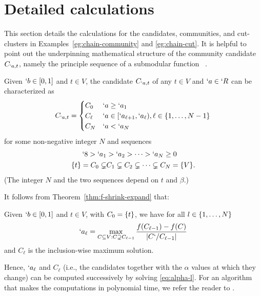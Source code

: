 \section{Detailed calculations}
\label{sec:calculations}
This section details the calculations for the candidates, communities, and cut-clusters
in Examples~\ref{eg:chain-community} and \ref{eg:chain-cut}.
It is helpful to point out the underpinning mathematical structure of
the community candidate $C_{`a,t}$, namely the principle sequence of a submodular function~\cite{fujishige80} \cite{fujishige-pp-revisited}.

\begin{proposition}
  \label{pro:ps}
  Given $`b\in [0,1]$ and $t\in V$, the candidate $C_{`a,t}$ of any $t\in V$ and $`a\in `R$ can be characterized as
  \begin{align}
    C_{`a,t}  = \begin{cases}
      C_0 & `a\geq `a_1\\
      C_{\ell} & `a\in [`a_{\ell+1},`a_{\ell}), \ell \in \{1,\dots,N-1\}\\
      C_N & `a<`a_N
      \end{cases}
  \end{align}
  for some non-negative integer $N$ and sequences
  \begin{align}
    `8 > `a_1 &> `a_2 > \dots > `a_N \geq 0 \label{eq:`as}\\
    \{t\}=C_0 \subsetneq & C_1  \subsetneq C_2 \subsetneq \dots\subsetneq C_N = \{V\}.\label{eq:Cs}
  \end{align}
  (The integer $N$ and the two sequences depend on $t$ and $\beta$.)
\end{proposition}

It follows from Theorem~\ref{thm:f-shrink-expand} that:
\begin{Corollary}
	\label{cor:alpha-l}
	Given $`b\in [0,1]$ and $t\in V$, with $C_{0} = \{t\}$, we have for all $l\in \{1,\dots, N\}$
  \begin{align}
	 \label{eq:alpha-l}
    `a_{\ell} =  \max_{C\subseteq V: C\supsetneq C_{\ell -1 }}  
				 \frac{f(C_{\ell - 1})- f(C)}{\abs{C`/C_{\ell -1}}} %
  \end{align}
  and $C_{\ell}$ is the inclusion-wise maximum solution.
\end{Corollary}
Hence, $`a_{\ell}$ and $C_{\ell}$ (i.e., the candidates together with the $\alpha$ values at which
they change) can be computed successively by solving \eqref{eq:alpha-l}.
For an algorithm that makes the computations in polynomial time, we refer the reader to
\cite{nagano2011size}.

